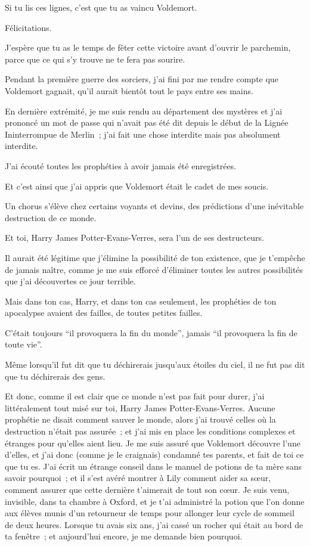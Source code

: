 \later
\begin{writtenNote}

Si tu lis ces lignes, c'est que tu as vaincu Voldemort.

Félicitations.

J'espère que tu as le temps de fêter cette victoire avant d'ouvrir le parchemin, parce que ce qui s'y trouve ne te fera pas sourire.

Pendant la première guerre des sorciers, j'ai fini par me rendre compte que Voldemort gagnait, qu'il aurait bientôt tout le pays entre ses mains.

En dernière extrémité, je me suis rendu au département des mystères et j'ai prononcé un mot de passe qui n'avait pas été dit depuis le début de la Lignée Ininterrompue de Merlin~; j'ai fait une chose interdite mais pas absolument interdite.

J'ai écouté toutes les prophéties à avoir jamais été enregistrées.

Et c'est ainsi que j'ai appris que Voldemort était le cadet de mes soucis.

Un chorus s'élève chez certains voyants et devins, des prédictions d'une inévitable destruction de ce monde.

Et toi, Harry James Potter-Evans-Verres, sera l'un de ses destructeurs.

Il aurait été légitime que j'élimine la possibilité de ton existence, que je t'empêche de jamais naître, comme je me suis efforcé d'éliminer toutes les autres possibilités que j'ai découvertes ce jour terrible.

Mais dans ton cas, Harry, et dans ton cas seulement, les prophéties de ton apocalypse avaient des failles, de toutes petites failles.

C'était toujours “il provoquera la fin du monde”, jamais “il provoquera la fin de toute vie”.

Même lorsqu'il fut dit que tu déchirerais jusqu'aux étoiles du ciel, il ne fut pas dit que tu déchirerais des gens.

Et donc, comme il est clair que ce monde n'est pas fait pour durer, j'ai littéralement tout misé sur toi, Harry James Potter-Evans-Verres. Aucune prophétie ne disait comment sauver le monde, alors j'ai trouvé celles où la destruction n'était pas assurée~; et j'ai mis en place les conditions complexes et étranges pour qu'elles aient lieu. Je me suis assuré que Voldemort découvre l'une d'elles, et j'ai donc (comme je le craignais) condamné tes parents, et fait de toi ce que tu es. J'ai écrit un étrange conseil dans le manuel de potions de ta mère sans savoir pourquoi~; et il s'est avéré montrer à Lily comment aider sa sœur, comment assurer que cette dernière t'aimerait de tout son cœur. Je suis venu, invisible, dans ta chambre à Oxford, et je t'ai administré la potion que l'on donne aux élèves munis d'un retourneur de temps pour allonger leur cycle de sommeil de deux heures. Lorsque tu avais six ans, j'ai cassé un rocher qui était au bord de ta fenêtre~; et aujourd'hui encore, je me demande bien pourquoi.


\end{writtenNote}
